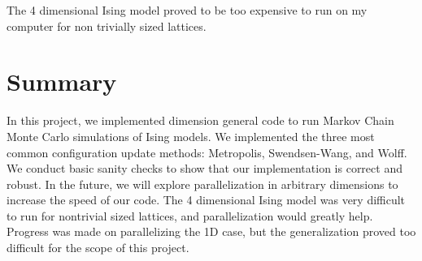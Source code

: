 \documentclass[a4paper]{article}
\begin{document}
The 4 dimensional Ising model proved to be too expensive to run on my computer for non trivially sized lattices.


\section{Summary}
In this project, we implemented dimension general code to run Markov Chain Monte Carlo simulations of Ising models. We implemented the three most common configuration update methods: Metropolis, Swendsen-Wang, and Wolff. We conduct basic sanity checks to show that our implementation is correct and robust. In the future, we will explore parallelization in arbitrary dimensions to increase the speed of our code. The 4 dimensional Ising model was very difficult to run for nontrivial sized lattices, and parallelization would greatly help. Progress was made on parallelizing the 1D case, but the generalization proved too difficult for the scope of this project.
\end{document}
